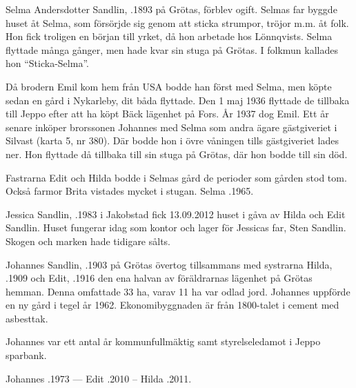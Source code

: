 Selma Andersdotter Sandlin, .1893 på Grötas, förblev ogift. Selmas far byggde huset åt Selma, som försörjde sig genom att sticka strumpor, tröjor m.m. åt folk. Hon fick troligen en början till yrket, då hon arbetade hos Lönnqvists. Selma flyttade många gånger, men hade kvar sin stuga på Grötas. I folkmun kallades hon ``Sticka-Selma''.

Då brodern Emil kom hem från USA bodde han först med Selma, men köpte sedan en gård i Nykarleby, dit båda flyttade. Den 1 maj 1936 flyttade de tillbaka till Jeppo efter att ha köpt Bäck lägenhet på Fors. År 1937 dog Emil. Ett år senare inköper brorssonen Johannes med Selma som andra ägare gästgiveriet i Silvast (karta 5, nr 380). Där bodde hon i övre våningen tills gästgiveriet lades ner. Hon flyttade då tillbaka till sin stuga på Grötas, där hon bodde till sin död.

Fastrarna Edit och Hilda bodde i Selmas gård de perioder som gården stod tom. Också farmor Brita vistades mycket i stugan. Selma .1965.






Jessica Sandlin, .1983 i Jakobstad fick 13.09.2012 huset i gåva av Hilda och Edit Sandlin. Huset fungerar idag som kontor och lager för Jessicas far, Sten Sandlin. Skogen och marken hade tidigare sålts.\jhvspace{}


Johannes Sandlin, .1903 på Grötas övertog tillsammans med systrarna Hilda, .1909 och Edit, .1916 den ena halvan av föräldrarnas lägenhet på Grötas hemman. Denna omfattade 33 ha, varav 11 ha var odlad jord. Johannes uppförde en ny gård i tegel år 1962. Ekonomibyggnaden är från 1800-talet i cement med asbesttak.

Johannes var ett antal år kommunfullmäktig samt styrelseledamot i Jeppo sparbank.

Johannes .1973  ---  Edit .2010  --  Hilda .2011.





